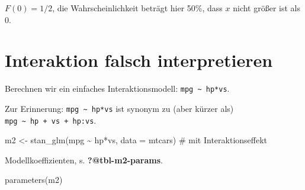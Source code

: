 \documentclass[
  a4paper,
  DIV=11]{scrreprt}
\newenvironment{Shaded}{\begin{snugshade}}{\end{snugshade}}
\newcommand{\AttributeTok}[1]{\textcolor[rgb]{0.40,0.45,0.13}{#1}}
\newcommand{\CommentTok}[1]{\textcolor[rgb]{0.37,0.37,0.37}{#1}}
\newcommand{\FunctionTok}[1]{\textcolor[rgb]{0.28,0.35,0.67}{#1}}
\newcommand{\NormalTok}[1]{\textcolor[rgb]{0.00,0.23,0.31}{#1}}
\newcommand{\OtherTok}[1]{\textcolor[rgb]{0.00,0.23,0.31}{#1}}
\newcommand{\SpecialCharTok}[1]{\textcolor[rgb]{0.37,0.37,0.37}{#1}}
\theoremstyle{definition}
\theoremstyle{remark}
\begin{document}
\(F(0)=1/2\), die Wahrscheinlichkeit beträgt hier 50\%, dass \(x\) nicht
größer ist als 0.

\hypertarget{interaktion-falsch-interpretieren}{%
\section{Interaktion falsch interpretieren
🤷}\label{interaktion-falsch-interpretieren}}

Berechnen wir ein einfaches Interaktionsmodell:
\texttt{mpg\ \textasciitilde{}\ hp*vs}.

\begin{tcolorbox}[enhanced jigsaw, left=2mm, colframe=quarto-callout-note-color-frame, opacityback=0, arc=.35mm, rightrule=.15mm, breakable, toptitle=1mm, colbacktitle=quarto-callout-note-color!10!white, colback=white, coltitle=black, bottomrule=.15mm, titlerule=0mm, opacitybacktitle=0.6, bottomtitle=1mm, title=\textcolor{quarto-callout-note-color}{\faInfo}\hspace{0.5em}{Hinweis}, toprule=.15mm, leftrule=.75mm]
Zur Erinnerung: \texttt{mpg\ \textasciitilde{}\ hp*vs} ist synonym zu
(aber kürzer als) \texttt{mpg\ \textasciitilde{}\ hp\ +\ vs\ +\ hp:vs}.
\end{tcolorbox}

\begin{Shaded}
\begin{Highlighting}[]
\NormalTok{m2 }\OtherTok{\textless{}{-}} \FunctionTok{stan\_glm}\NormalTok{(mpg }\SpecialCharTok{\textasciitilde{}}\NormalTok{ hp}\SpecialCharTok{*}\NormalTok{vs, }\AttributeTok{data =}\NormalTok{ mtcars)  }\CommentTok{\# mit Interaktionseffekt}
\end{Highlighting}
\end{Shaded}

Modellkoeffizienten, s. \textbf{?@tbl-m2-params}.

\begin{Shaded}
\begin{Highlighting}[]
\FunctionTok{parameters}\NormalTok{(m2)}
\end{Highlighting}
\end{Shaded}
\end{document}
